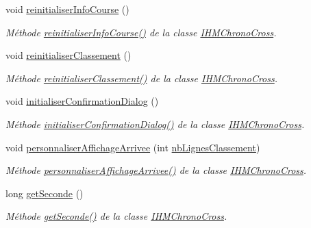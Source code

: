 \begin{DoxyCompactItemize}
void \hyperlink{class_i_h_m_chrono_cross_a1149f4f57c8cf34048f93fba6b4176b3}{reinitialiser\+Info\+Course} ()
\begin{DoxyCompactList}\small\item\em Méthode \hyperlink{class_i_h_m_chrono_cross_a1149f4f57c8cf34048f93fba6b4176b3}{reinitialiser\+Info\+Course()} de la classe \hyperlink{class_i_h_m_chrono_cross}{I\+H\+M\+Chrono\+Cross}. \end{DoxyCompactList}\item 
void \hyperlink{class_i_h_m_chrono_cross_aaf8fa3bf16956fd0e0ceeab6e65f6741}{reinitialiser\+Classement} ()
\begin{DoxyCompactList}\small\item\em Méthode \hyperlink{class_i_h_m_chrono_cross_aaf8fa3bf16956fd0e0ceeab6e65f6741}{reinitialiser\+Classement()} de la classe \hyperlink{class_i_h_m_chrono_cross}{I\+H\+M\+Chrono\+Cross}. \end{DoxyCompactList}\item 
void \hyperlink{class_i_h_m_chrono_cross_a866a247fad23eca2af31ed985afe7cd3}{initialiser\+Confirmation\+Dialog} ()
\begin{DoxyCompactList}\small\item\em Méthode \hyperlink{class_i_h_m_chrono_cross_a866a247fad23eca2af31ed985afe7cd3}{initialiser\+Confirmation\+Dialog()} de la classe \hyperlink{class_i_h_m_chrono_cross}{I\+H\+M\+Chrono\+Cross}. \end{DoxyCompactList}\item 
void \hyperlink{class_i_h_m_chrono_cross_a41c2ff49d25069f8dfa2a7b3d0606d38}{personnaliser\+Affichage\+Arrivee} (int \hyperlink{class_i_h_m_chrono_cross_a86ed3469ca99988211bcf0970527c119}{nb\+Lignes\+Classement})
\begin{DoxyCompactList}\small\item\em Méthode \hyperlink{class_i_h_m_chrono_cross_a41c2ff49d25069f8dfa2a7b3d0606d38}{personnaliser\+Affichage\+Arrivee()} de la classe \hyperlink{class_i_h_m_chrono_cross}{I\+H\+M\+Chrono\+Cross}. \end{DoxyCompactList}\item 
long \hyperlink{class_i_h_m_chrono_cross_a0dfb2dc2b85937b1f218584ce84e9d98}{get\+Seconde} ()
\begin{DoxyCompactList}\small\item\em Méthode \hyperlink{class_i_h_m_chrono_cross_a0dfb2dc2b85937b1f218584ce84e9d98}{get\+Seconde()} de la classe \hyperlink{class_i_h_m_chrono_cross}{I\+H\+M\+Chrono\+Cross}. \end{DoxyCompactList}\item 

\end{DoxyCompactItemize}
